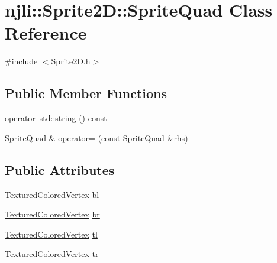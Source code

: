 \hypertarget{classnjli_1_1_sprite2_d_1_1_sprite_quad}{}\section{njli\+:\+:Sprite2D\+:\+:Sprite\+Quad Class Reference}
\label{classnjli_1_1_sprite2_d_1_1_sprite_quad}


{\ttfamily \#include $<$Sprite2\+D.\+h$>$}

\subsection*{Public Member Functions}
\begin{DoxyCompactItemize}
\item 
\mbox{\hyperlink{classnjli_1_1_sprite2_d_1_1_sprite_quad_a34d7a2ea6b0b129abe89f2f6fd37a5a4}{operator std\+::string}} () const
\item 
\mbox{\hyperlink{classnjli_1_1_sprite2_d_1_1_sprite_quad}{Sprite\+Quad}} \& \mbox{\hyperlink{classnjli_1_1_sprite2_d_1_1_sprite_quad_a97bb5f82275fdce50e4352eab0e14e6c}{operator=}} (const \mbox{\hyperlink{classnjli_1_1_sprite2_d_1_1_sprite_quad}{Sprite\+Quad}} \&rhs)
\end{DoxyCompactItemize}
\subsection*{Public Attributes}
\begin{DoxyCompactItemize}
\item 
\mbox{\hyperlink{structnjli_1_1_geometry_1_1_textured_colored_vertex}{Textured\+Colored\+Vertex}} \mbox{\hyperlink{classnjli_1_1_sprite2_d_1_1_sprite_quad_ae0ffef0622181dcc734b02cef8f45075}{bl}}
\item 
\mbox{\hyperlink{structnjli_1_1_geometry_1_1_textured_colored_vertex}{Textured\+Colored\+Vertex}} \mbox{\hyperlink{classnjli_1_1_sprite2_d_1_1_sprite_quad_aa7033cec9b83bad9dfcadb89f29dcf94}{br}}
\item 
\mbox{\hyperlink{structnjli_1_1_geometry_1_1_textured_colored_vertex}{Textured\+Colored\+Vertex}} \mbox{\hyperlink{classnjli_1_1_sprite2_d_1_1_sprite_quad_aecfbaa6fa13750f9fa1347cf36d12f7e}{tl}}
\item 
\mbox{\hyperlink{structnjli_1_1_geometry_1_1_textured_colored_vertex}{Textured\+Colored\+Vertex}} \mbox{\hyperlink{classnjli_1_1_sprite2_d_1_1_sprite_quad_a0eb387285104214c4b47b616a923d48d}{tr}}
\end{DoxyCompactItemize}


